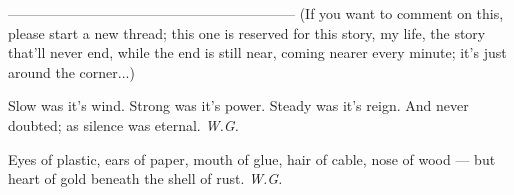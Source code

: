 --------------------------------------------------------------
(If you want to comment on this, please start a new thread; this one is reserved for this story, my life, the story that'll never end, while the end is still near, coming nearer every minute; it's just around the corner...)

Slow 
was it's wind. 
Strong 
was it's power. 
Steady 
was it's reign. 
And never doubted; 
as silence 
was eternal. 
\emph{W.G.}

Eyes of plastic, 
ears of paper, 
mouth of glue, 
hair of cable, 
nose of wood --- 
but heart of gold 
beneath the shell 
of rust. 
\emph{W.G.}
